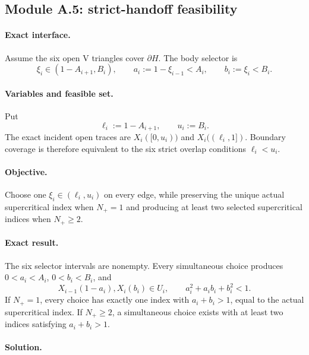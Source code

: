 \subsection{Module A.5: strict-handoff feasibility}

\paragraph{Exact interface.}
Assume the six open V triangles cover $\partial H$.  The body selector is
\[
 \xi_i\in(1-A_{i+1},B_i),
 \qquad
 a_i:=1-\xi_{i-1}<A_i,
 \qquad
 b_i:=\xi_i<B_i.
\]

\paragraph{Variables and feasible set.}
Put
\[
 \ell_i:=1-A_{i+1},
 \qquad
 u_i:=B_i.
\]
The exact incident open traces are $X_i([0,u_i))$ and
$X_i((\ell_i,1])$.  Boundary coverage is therefore equivalent to the six
strict overlap conditions $\ell_i<u_i$.

\paragraph{Objective.}
Choose one $\xi_i\in(\ell_i,u_i)$ on every edge, while preserving the unique
actual supercritical index when $N_+=1$ and producing at least two selected
supercritical indices when $N_+\ge2$.

\paragraph{Exact result.}

\begin{lemma}
\label{lem:app-strict-handoff-selection}
The six selector intervals are nonempty.  Every simultaneous choice produces
$0<a_i<A_i$, $0<b_i<B_i$, and
\[
 X_{i-1}(1-a_i),X_i(b_i)\in U_i,
 \qquad
 a_i^2+a_ib_i+b_i^2<1.
\]
If $N_+=1$, every choice has exactly one index with $a_i+b_i>1$, equal to the
actual supercritical index.  If $N_+\ge2$, a simultaneous choice exists with
at least two indices satisfying $a_i+b_i>1$.
\end{lemma}

\paragraph{Solution.}


